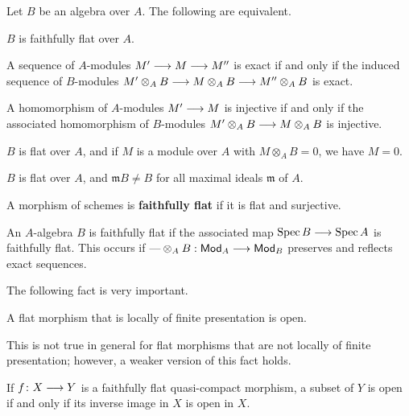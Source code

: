 \begin{1   PRELIMINARY NOTIONS}
\begin{1.1 Algebraic geometry}
\begin{proposition}
Let $B$ be an algebra over $A$. The following are equivalent.

\begin{enumeratei}

\item $B$ is faithfully flat over $A$.

\item A sequence of $A$-modules $M' \arr M \arr M''$ is exact if and only if the induced sequence of $B$-modules $M' \otimes_A B \arr M \otimes_A B \arr M'' \otimes_A B$  is exact.

\item A homomorphism of $A$-modules $M' \arr M$ is injective if and only if the associated homomorphism of $B$-modules $M' \otimes_A B \arr M \otimes_A B$ is injective.

\item $B$ is flat over $A$, and if $M$ is a module over $A$ with $M
\otimes_A B = 0$, we have $M = 0$.

\item $B$ is flat over $A$, and $\mathfrak{m}B \neq B$ for all maximal ideals $\mathfrak{m}$ of $A$. 

\end{enumeratei}
\end{proposition}
\begin{shaded}
A morphism of schemes is \textbf{faithfully flat} if it is flat and surjective.

An $A$-algebra $B$ is faithfully flat if the associated map $\operatorname{Spec} B\longrightarrow\operatorname{Spec} A$ is faithfully flat. This occurs if $\textup{---}\otimes_AB:\mathsf{Mod}_A\longrightarrow\mathsf{Mod}_B$ preserves and reflects exact sequences.
\end{shaded}


The following fact is very important.

\begin{proposition}
\label{prop:flat->open}
A flat morphism that is locally of finite presentation is open.
\end{proposition}

This is not true in general for flat morphisms that are not locally of finite presentation; however, a weaker version of this fact holds.

\begin{proposition}
\label{prop:flat->quotient-topology}
If $f \colon X \arr Y$ is a faithfully flat quasi-compact morphism, a subset of $Y$ is open if and only if its inverse image in $X$ is open in $X$.
\end{proposition}


\end{1.1 Algebraic geometry}
\end{1   PRELIMINARY NOTIONS}
